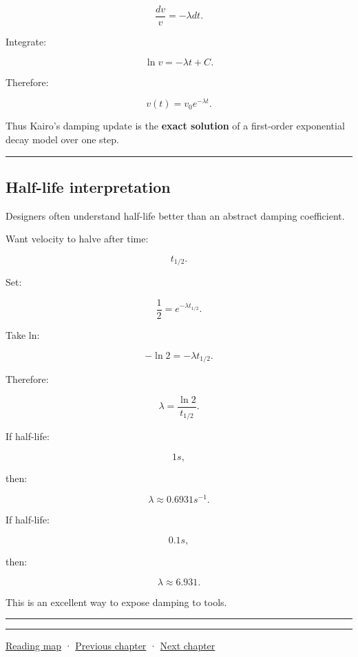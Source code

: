 \[
\frac{dv}{v}
=
-\lambda dt.
\]

Integrate:

\[
\ln v
=
-\lambda t+C.
\]

Therefore:

\[
v(t)=v_0e^{-\lambda t}.
\]

Thus Kairo's damping update is the \textbf{exact solution} of a first-order exponential decay model over one step.

\begin{center}\rule{0.5\linewidth}{0.5pt}\end{center}

\subsection{Half-life interpretation}\label{06-engine-ii-ch038-half-life-interpretation}

\hypertarget{06-engine-ii-ch038-half-life-interpretation}{}

Designers often understand half-life better than an abstract damping coefficient.

Want velocity to halve after time:

\[
t_{1/2}.
\]

Set:

\[
\frac12
=
e^{-\lambda t_{1/2}}.
\]

Take ln:

\[
-\ln2
=
-\lambda t_{1/2}.
\]

Therefore:

\[
\boxed{
\lambda
=
\frac{\ln2}{t_{1/2}}.
}
\]

If half-life:

\[
1s,
\]

then:

\[
\lambda\approx0.6931s^{-1}.
\]

If half-life:

\[
0.1s,
\]

then:

\[
\lambda\approx6.931.
\]

This is an excellent way to expose damping to tools.

\begin{center}\rule{0.5\linewidth}{0.5pt}\end{center}

\begin{center}\rule{0.5\linewidth}{0.5pt}\end{center}

\hyperref[volume-reading-map]{Reading map} · \hyperref[06-engine-ii-ch037-physical-examples-and-state-validation]{Previous chapter} · \hyperref[06-engine-ii-ch039-composable-timesteps-and-stable-simulation-policy]{Next chapter}
